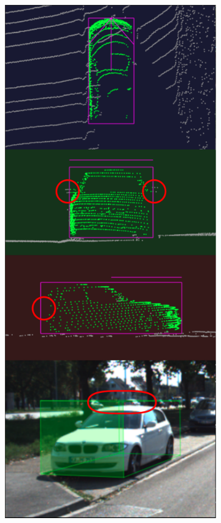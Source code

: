 \documentclass[letterpaper, 10 pt, conference]{ieeeconf}  %
\begin{document}
\begin{figure}
	~
	\begin{subfigure}{0.3\linewidth}
		\includegraphics[scale=0.2]{./figures/annocheck}
	\end{subfigure}
	~
	\begin{subfigure}{0.3\linewidth}

\end{subfigure}
\end{figure}
\end{document}
